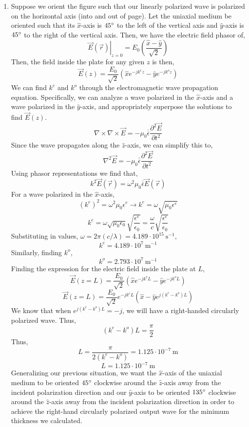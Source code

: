 \documentclass[12pt]{article}
\begin{document}
\begin{enumerate}
\begin{enumerate}
		\item [c.]
		Suppose we orient the figure such that our linearly polarized wave is polarized on the horizontal axis (into and out of page).
		Let the uniaxial medium be oriented such that its $\hat x$-axis is $45 \degree$ to the left of the vertical axis and $\hat y$-axis is $45\degree$ to the right of the vertical axis.
		Then, we have the electric field phasor of,
		\[\left.\vec E(\vec r)\right|_{z=0}=E_0\left(\frac{\hat x - \hat y}{\sqrt{2}}\right)\]
		Then, the field inside the plate for any given $z$ is then,
		\[\vec E(z)=\frac{E_0}{\sqrt{2}}\left(\hat x e^{-jk^ez}-\hat ye^{-jk^oz}\right)\]
		We can find $k^e$ and $k^o$ through the electromagnetic wave propagation equation.
		Specifically, we can analyze a wave polarized in the $\hat x$-axis and a wave polarized in the $\hat y$-axis, and appropriately superpose the solutions to find $\vec E(z)$.
		\[\nabla \times \nabla \times \vec E = -\mu_0\overline{\overline{\epsilon}}\frac{\partial^2 \vec E}{\partial t^2}\]
		Since the wave propagates along the $\hat z$-axis, we can simplify this to,
		\[\nabla^2\vec E = -\mu_0 \overline{\overline{\epsilon}}\frac{\partial^2\vec E}{\partial t^2}\]
		Using phasor representations we find that,
		\[k^2\vec E(\vec r)=\omega^2 \mu_0 \overline{\overline{\epsilon}}\vec E(\vec r)\]
		For a wave polarized in the $\hat x$-axis,
		\[(k^e)^2=\omega^2\mu_0\epsilon^e\to k^e =\omega\sqrt{\mu_0\epsilon^e}\]
		\[k^e=\omega\sqrt{\mu_0\epsilon_0}\sqrt{\frac{\epsilon^e}{\epsilon_0}}=\frac{\omega}{c}\sqrt{\frac{\epsilon^e}{\epsilon_0}}\]
		Substituting in values, $\omega=2\pi(c/\lambda)=4.189\cdot 10^{15}\:\mathrm{s}^{-1}$,
		\[k^e = 4.189 \cdot 10^7 \: \mathrm{m}^{-1}\]
		Similarly, finding $k^o$,
		\[k^o=2.793 \cdot 10^7 \: \mathrm{m}^{-1}\]
		Finding the expression for the electric field inside the plate at $L$,
		\[\vec E(z=L)=\frac{E_0}{\sqrt{2}}(\hat xe^{-jk^eL}-\hat ye^{-jk^oL})\]
		\[\vec E(z=L)=\frac{E_0}{\sqrt{2}}e^{-jk^eL}(\hat x-\hat ye^{j(k^e-k^o)L})\]
		We know that when $e^{j(k^e-k^o)L}=- j$, we will have a right-handed circularly polarized wave.
		Thus,
		\[(k^e-k^o)L = \frac{\pi}{2}\]
		Thus,
		\[L = \frac{\pi}{2(k^e-k^o)}=1.125 \cdot 10^{-7}\:\mathrm{m}\]
		\[\boxed{L=1.125 \cdot 10^{-7}\:\mathrm{m}}\]
		Generalizing our previous situation, we want the $\hat x$-axis of the uniaxial medium to be oriented $45\degree$ clockwise around the $\hat z$-axis away from the incident polarization direction and our $\hat y$-axis to be oriented $135\degree$ clockwise around the $\hat z$-axis away from the incident polarization direction in order to achieve the right-hand circularly polarized output wave for the minimum thickness we calculated.


\end{enumerate}
\end{enumerate}
\end{document}
